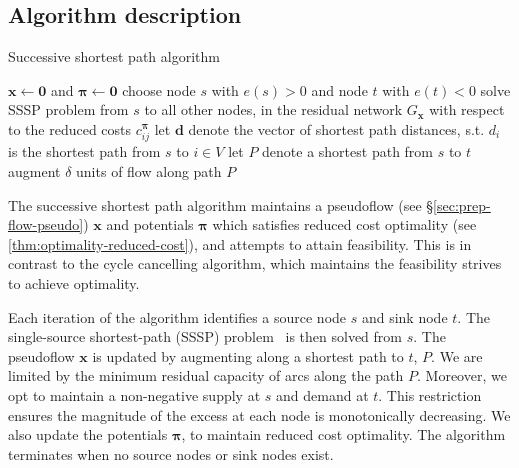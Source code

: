 \subsection{Algorithm description}

\begin{algorithm}
    \caption{Successive shortest path algorithm}
    \label{algo:successive-shortest-path}
    \begin{algorithmic}[1]
        \State $\mathbf{x} \gets \mathbf{0}$ and $\boldsymbol{\pi} \gets \mathbf{0}$
          \State choose node $s$ with $e(s) > 0$ and node $t$ with $e(t) < 0$\footnotemark
          \State solve SSSP problem from $s$ to all other nodes, in the residual network $G_{\mathbf{x}}$ with respect to the reduced costs $c^{\boldsymbol{\pi}}_{ij}$
          \State let $\mathbf{d}$ denote the vector of shortest path distances, s.t. $d_i$ is the shortest path from $s$ to $i\in V$
          \State let $P$ denote a shortest path from $s$ to $t$
          \State augment $\delta$ units of flow along path $P$
        \EndWhile
    \end{algorithmic}
\end{algorithm}


The successive shortest path algorithm maintains a pseudoflow (see \S\ref{sec:prep-flow-pseudo}) $\mathbf{x}$ and potentials $\boldsymbol{\pi}$ which satisfies reduced cost optimality (see \cref{thm:optimality-reduced-cost}), and attempts to attain feasibility. This is in contrast to the cycle cancelling algorithm, which maintains the feasibility strives to achieve optimality.

Each iteration of the algorithm identifies a source node $s$ and sink node $t$. The single-source shortest-path (SSSP) problem~\cite[ch.~24]{CLRS:2009} is then solved from $s$. The pseudoflow $\mathbf{x}$ is updated by augmenting along a shortest path to $t$, $P$. We are limited by the minimum residual capacity of arcs along the path $P$. Moreover, we opt to maintain a non-negative supply at $s$ and demand at $t$. This restriction ensures the magnitude of the excess at each node is monotonically decreasing. We also update the potentials $\boldsymbol{\pi}$, to maintain reduced cost optimality. The algorithm terminates when no source nodes or sink nodes exist.


